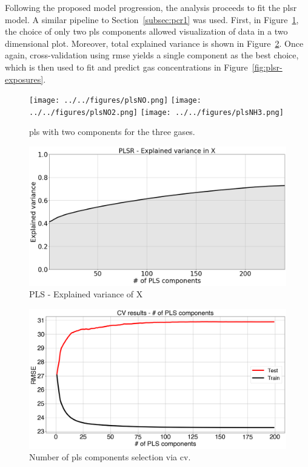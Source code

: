 Following the proposed model progression, the analysis proceeds to fit the \acrshort{plsr} model. A similar pipeline to Section~\ref{subsec:pcr1} was used. First, in Figure~\ref{fig:pls}, the choice of only two \acrshort{pls} components allowed visualization of data in a two dimensional plot. Moreover, total explained variance is shown in Figure~\ref{fig:pls-exp-var}. Once again, cross-validation using \acrshort{rmse} yields a single component as the best choice, which is then used to fit and predict gas concentrations in Figure~\ref{fig:plsr-exposures}.

\begin{figure}[!htb]
	\centering
	\texttt{[image: ../../figures/plsNO.png]}
	\hfill
	\texttt{[image: ../../figures/plsNO2.png]}
	\hfill
	\texttt{[image: ../../figures/plsNH3.png]}
	\caption{\acrshort{pls} with two components for the three gases.}
	\label{fig:pls}
\end{figure}

\begin{figure}[h]
	\centering
	\includegraphics[width=1\textwidth]{../figures/pls-explained-variance.png}
	\caption{PLS - Explained variance of X}
	\label{fig:pls-exp-var}
\end{figure}

\begin{figure}[h]
	\centering
	\includegraphics[width=1\textwidth]{../figures/pls-cv-exposures.png}
	\caption{Number of \acrshort{pls} components selection via \acrshort{cv}.}
	\label{fig:pls-cv-exposures}
\end{figure}


